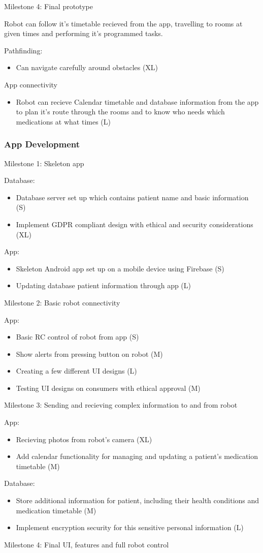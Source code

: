\documentclass{article}
\begin{document}
Milestone 4: Final prototype

Robot can follow it's timetable recieved from the app, travelling to rooms at given times and performing it's programmed tasks.

Pathfinding:
\begin{itemize}
\item Can navigate carefully around obstacles (XL)
\end{itemize}
App connectivity 
\begin{itemize}
\item Robot can recieve Calendar timetable and database information from the app to plan it's route through the rooms and to know who         needs which medications at what times (L)
\end{itemize}
    
\subsubsection{App Development}

Milestone 1: Skeleton app

Database:
\begin{itemize}
\item Database server set up which contains patient name and basic information (S)
\item Implement GDPR compliant design with ethical and security considerations  (XL)
\end{itemize}
    
App:
\begin{itemize}
\item Skeleton Android app set up on a mobile device using Firebase (S)
\item Updating database patient information through app (L)
\end{itemize}    
Milestone 2: Basic robot connectivity

App:
\begin{itemize}
\item Basic RC control of robot from app (S)
\item Show alerts from pressing button on robot (M)
\item Creating a few different UI designs (L)
\item Testing UI designs on consumers with ethical approval (M)
\end{itemize}
Milestone 3: Sending and recieving complex information to and from robot

App:
\begin{itemize}
\item Recieving photos from robot's camera (XL)
\item Add calendar functionality for managing and updating a patient's medication timetable (M)
\end{itemize}
Database:
\begin{itemize}
\item Store additional information for patient, including their health conditions and medication timetable (M)
\item Implement encryption security for this sensitive personal information (L)
\end{itemize}
Milestone 4: Final UI, features and full robot control
\end{document}
